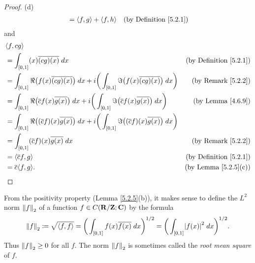 \begin{proof}{(d)}
\begin{align*}
         & = \inner*{f, g} + \inner*{f, h}                                                                                                     & \text{(by Definition \ref{5.2.1})}
    \end{align*}
    and
    \begin{align*}
         & \inner*{f, cg}                                                                                                                                                                                   \\
         & = \int_{[0, 1]} (x) \overline{(cg)(x)} \; dx                                                                                                                & \text{(by Definition \ref{5.2.1})} \\
         & = \int_{[0, 1]} \Re\big(f(x) \overline{(cg)(x)}\big) \; dx + i \bigg(\int_{[0, 1]} \Im\big(f(x) \overline{(cg)(x)}\big) \; dx\bigg)                         & \text{(by Remark \ref{5.2.2})}     \\
         & = \int_{[0, 1]} \Re\big(\overline{c} f(x) \overline{g(x)}\big) \; dx + i \bigg(\int_{[0, 1]} \Im\big(\overline{c} f(x) \overline{g(x)}\big) \; dx\bigg)     & \text{(by Lemma \ref{4.6.9})}      \\
         & = \int_{[0, 1]} \Re\big((\overline{c} f)(x) \overline{g(x)}\big) \; dx + i \bigg(\int_{[0, 1]} \Im\big((\overline{c} f)(x) \overline{g(x)}\big) \; dx\bigg)                                      \\
         & = \int_{[0, 1]} (\overline{c} f)(x) \overline{g(x)} \; dx                                                                                                   & \text{(by Remark \ref{5.2.2})}     \\
         & = \inner*{\overline{c} f, g}                                                                                                                                & \text{(by Definition \ref{5.2.1})} \\
         & = \overline{c} \inner*{f, g}.                                                                                                                               & \text{(by Lemma \ref{5.2.5}(c))}
    \end{align*}
\end{proof}

\begin{additional corollary}\label{ac 5.2.1}
From the positivity property (Lemma \ref{5.2.5}(b)), it makes sense to define the \(L^2\) norm \(\norm*{f}_2\) of a function \(f \in C(\R / \Z ; \C)\) by the formula
\[
    \norm*{f}_2 \coloneqq \sqrt{\inner*{f, f}} = \bigg(\int_{[0, 1]} f(x) \overline{f(x)} \; dx\bigg)^{1 / 2} = \bigg(\int_{[0, 1]} \abs{f(x)}^2 \; dx\bigg)^{1 / 2}.
\]
Thus \(\norm*{f}_2 \geq 0\) for all \(f\).
The norm \(\norm*{f}_2\) is sometimes called the \emph{root mean square} of \(f\).
\end{additional corollary}

